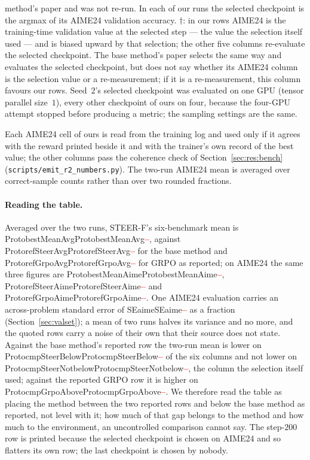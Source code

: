 \documentclass[11pt]{article}
\providecommand{\PENDING}{\textcolor{red}{\textbf{--}}}
\newcommand{\num}[1]{\ifcsname #1\endcsname\csname #1\endcsname\else\PENDING\fi}
\begin{document}
\begin{table}[t]
{method's paper and was not re-run. In each of our runs the selected checkpoint is
the argmax of its AIME24 validation accuracy. $\dagger$: in our rows AIME24 is the
training-time validation value at the selected step --- the value the selection
itself used --- and is biased upward by that selection; the other five columns
re-evaluate the selected checkpoint. The base method's paper selects the same way
and evaluates the selected checkpoint, but does not say whether its AIME24 column is
the selection value or a re-measurement; if it is a re-measurement, this column
favours our rows. Seed~$2$'s selected checkpoint was evaluated on one GPU (tensor
parallel size~$1$), every other checkpoint of ours on four, because the four-GPU
attempt stopped before producing a metric; the sampling settings are the same.}
\label{tab:reported}
\end{table}

Each AIME24 cell of ours is read from the training log and used only if it agrees
with the reward printed beside it and with the trainer's own record of the best
value; the other columns pass the coherence check of Section~\ref{sec:res:bench}
(\texttt{scripts/emit\_r2\_numbers.py}). The two-run AIME24 mean is averaged over
correct-sample counts rather than over two rounded fractions.

\paragraph{Reading the table.} Averaged over the two runs, STEER-F's six-benchmark
mean is \num{ProtobestMeanAvg}, against \num{ProtorefSteerAvg} for the base method and
\num{ProtorefGrpoAvg} for GRPO as reported; on AIME24 the same three figures are
\num{ProtobestMeanAime}, \num{ProtorefSteerAime} and \num{ProtorefGrpoAime}. One
AIME24 evaluation carries an across-problem standard error of \num{SEaime} as a
fraction (Section~\ref{sec:valset}); a mean of two runs halves its variance and no
more, and the quoted rows carry a noise of their own that their source does not
state. Against the base method's reported row the two-run mean is lower on
\num{ProtocmpSteerBelow} of the six columns and not lower on
\num{ProtocmpSteerNotbelow}, the column the selection itself used; against the
reported GRPO row it is higher on \num{ProtocmpGrpoAbove}. We therefore read the
table as placing the method between the two reported rows and below the base method
as reported, not level with it; how much of that gap belongs to the method and how
much to the environment, an uncontrolled comparison cannot say. The step-$200$ row is
printed because the selected checkpoint is chosen on AIME24 and so flatters its own
row; the last checkpoint is chosen by nobody.
\end{document}
